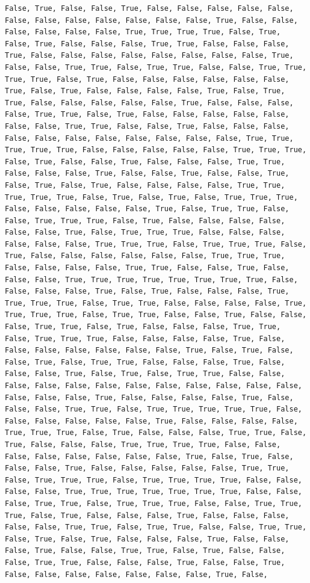 \documentclass[
  letterpaper,
  DIV=11,
  numbers=noendperiod]{scrartcl}
\begin{document}
\begin{verbatim}
False, True, False, False, True, False, False, False, False, False, False, False, False, False, False, False, False, True, False, False, False, False, False, False, True, True, True, True, False, True, False, True, False, False, False, True, True, False, False, False, True, False, False, False, False, False, False, False, False, True, False, False, True, True, False, True, True, False, False, True, True, True, True, False, True, False, False, False, False, False, False, True, False, True, False, False, False, False, True, False, True, True, False, False, False, False, False, True, False, False, False, False, True, True, False, True, False, False, False, False, False, False, False, True, True, False, False, True, False, False, False, False, False, False, False, False, False, False, False, True, True, True, True, True, False, False, False, False, False, True, True, True, False, True, False, False, True, False, False, False, True, True, False, False, False, True, False, False, True, False, False, True, False, True, False, True, False, False, False, False, True, True, True, True, True, False, True, False, True, False, True, True, True, False, False, False, False, False, True, False, True, True, False, False, True, True, True, False, True, False, False, False, False, False, False, True, False, True, True, True, False, False, False, False, False, False, True, True, True, False, True, True, True, False, True, False, False, False, False, False, False, True, True, True, False, False, False, False, True, True, False, False, True, False, False, False, True, True, True, True, True, True, True, True, False, False, False, False, True, False, True, False, False, False, True, True, True, True, False, True, True, False, False, False, False, True, True, True, True, False, True, True, False, False, True, False, False, False, True, True, False, True, False, False, False, True, True, False, True, True, True, False, False, False, False, True, False, False, False, False, False, False, False, True, False, True, False, False, True, False, True, True, False, False, False, True, False, False, False, True, False, True, False, True, True, False, False, False, False, False, False, False, False, False, False, False, False, False, False, False, True, False, False, False, False, True, False, False, False, True, True, False, True, True, True, True, True, False, False, False, False, False, False, True, False, False, False, False, True, True, True, False, True, False, False, False, True, True, False, True, False, False, False, True, True, True, True, False, False, False, False, False, False, False, False, True, False, True, False, False, False, True, False, False, False, False, False, True, True, False, True, True, True, False, True, True, True, True, False, False, False, False, True, True, True, True, True, True, True, False, False, False, True, True, False, True, True, True, False, False, True, True, True, False, True, False, False, False, True, False, False, False, False, False, True, True, False, True, True, False, False, True, True, False, True, False, True, False, False, False, True, False, False, False, True, False, False, True, True, False, True, False, False, False, True, True, False, False, False, True, False, False, True, False, False, False, False, False, False, False, True, False, 
\end{verbatim}
\end{document}

